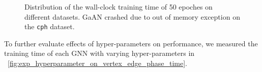 \begin{figure}[htb]
    \caption{Distribution of the wall-clock training time of 50 epoches on different datasets. GaAN crashed due to out of memory exception on the \texttt{cph} dataset.}
    \label{fig:exp_absolute_training_time}
\end{figure}

To further evaluate effects of hyper-parameters on performance, we measured the training time of each GNN with varying hyper-parameters in \figurename~\ref{fig:exp_hyperparameter_on_vertex_edge_phase_time}.

